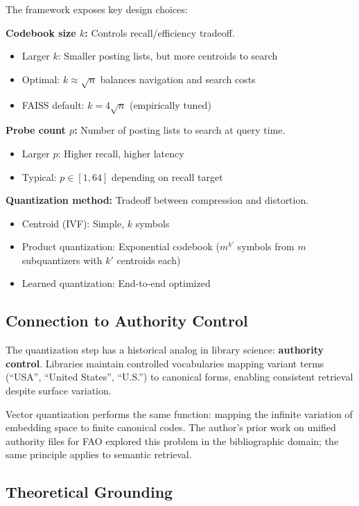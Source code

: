 \documentclass[manuscript,screen,nonacm]{acmart}
\begin{document}
The framework exposes key design choices:

\textbf{Codebook size $k$:} Controls recall/efficiency tradeoff.
\begin{itemize}
    \item Larger $k$: Smaller posting lists, but more centroids to search
    \item Optimal: $k \approx \sqrt{n}$ balances navigation and search costs
    \item FAISS default: $k = 4\sqrt{n}$ (empirically tuned)
\end{itemize}

\textbf{Probe count $p$:} Number of posting lists to search at query time.
\begin{itemize}
    \item Larger $p$: Higher recall, higher latency
    \item Typical: $p \in [1, 64]$ depending on recall target
\end{itemize}

\textbf{Quantization method:} Tradeoff between compression and distortion.
\begin{itemize}
    \item Centroid (IVF): Simple, $k$ symbols
    \item Product quantization: Exponential codebook ($m^{k'}$ symbols from $m$ subquantizers with $k'$ centroids each)
    \item Learned quantization: End-to-end optimized \cite{zandieh2025}
\end{itemize}

\subsection{Connection to Authority Control}

The quantization step has a historical analog in library science: \textbf{authority control}. Libraries maintain controlled vocabularies mapping variant terms (``USA'', ``United States'', ``U.S.'') to canonical forms, enabling consistent retrieval despite surface variation.

Vector quantization performs the same function: mapping the infinite variation of embedding space to finite canonical codes. The author's prior work on unified authority files for FAO \cite{caprazli2003} explored this problem in the bibliographic domain; the same principle applies to semantic retrieval.

\subsection{Theoretical Grounding}
\end{document}
